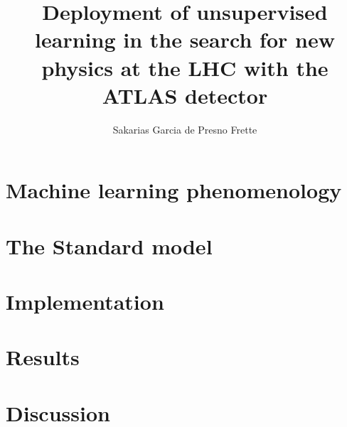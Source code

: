 \documentclass[UKenglish]{book}
\title{Deployment of unsupervised learning in the search for new physics at the LHC with the ATLAS detector}
\subtitle{}
\author{Sakarias Garcia de Presno Frette}
\begin{document}
\duoforside[dept={Department of Physics}, program={Master's Program Name}, long]                                         

\frontmatter{}


\tableofcontents{}

\mainmatter{}






               

\chapter{Machine learning phenomenology}\label{Chap:MLphenom}




\chapter{The Standard model}\label{Chap:SM}



\chapter{Implementation}\label{Chap:implementation}



\chapter{Results}\label{Chap:results}



\chapter{Discussion}\label{Chap:discussion}




\backmatter{}
\end{document}

